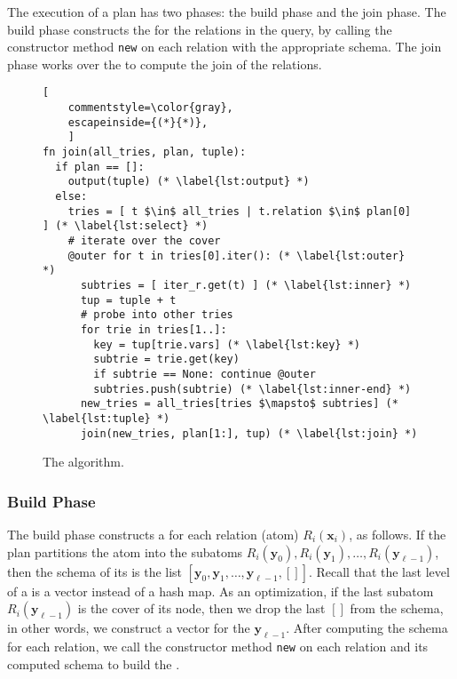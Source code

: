 
The execution of a \FJ plan has two phases: the build phase and the
join phase.  The build phase constructs the \GHTs for the relations in
the query, by calling the constructor method \lstinline|new| on each
relation with the appropriate schema.  The join phase works over the
\GHTs to compute the join of the relations.


\begin{figure}
  \begin{lstlisting}[
    commentstyle=\color{gray},
    escapeinside={(*}{*)},
    ]
fn join(all_tries, plan, tuple):
  if plan == []:
    output(tuple) (* \label{lst:output} *)
  else:
    tries = [ t $\in$ all_tries | t.relation $\in$ plan[0] ] (* \label{lst:select} *)
    # iterate over the cover
    @outer for t in tries[0].iter(): (* \label{lst:outer} *)
      subtries = [ iter_r.get(t) ] (* \label{lst:inner} *)
      tup = tuple + t
      # probe into other tries
      for trie in tries[1..]:     
        key = tup[trie.vars] (* \label{lst:key} *)
        subtrie = trie.get(key)
        if subtrie == None: continue @outer
        subtries.push(subtrie) (* \label{lst:inner-end} *)
      new_tries = all_tries[tries $\mapsto$ subtries] (* \label{lst:tuple} *)
      join(new_tries, plan[1:], tup) (* \label{lst:join} *)
\end{lstlisting}
  \caption{The \FJ algorithm.}
  \label{fig:fj-algo}
\end{figure}

\subsubsection*{Build Phase}
The build phase constructs a \GHT for each relation (atom)
$R_i(\bm x_i)$, as follows.  If the plan partitions the atom into the
subatoms $R_i(\bm y_0), R_i(\bm y_1), \ldots, R_i(\bm y_{\ell-1})$,
then the schema of its \GHT is the list
$[\bm y_0, \bm y_1, \ldots, \bm y_{\ell-1}, []]$.  Recall that the
last level of a \GHT is a vector instead of a hash map. As an
optimization, if the last subatom $R_i(\bm y_{\ell-1})$ is the cover
of its node, then we drop the last $[]$ from the schema, in other
words, we construct a vector for the $\bm y_{\ell-1}$.  After
computing the schema for each relation, we call the constructor method
\lstinline|new| on each relation and its computed schema to build the
\GHTs.

